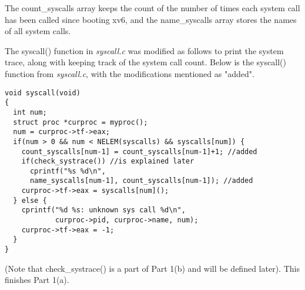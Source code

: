 \documentclass[a4paper]{article}
\begin{document}
\newpage
\noindent The count\_syscalls array keeps the count of the number of times each system call has been called since booting xv6, and the name\_syscalls array stores the names of all system calls. 
\newline

\noindent The syscall() function in \textit{syscall.c} was modified as follows to print the system trace, along with keeping track of the system call count. Below is the syscall() function from \textit{syscall.c}, with the modifications mentioned as "added".

\begin{lstlisting}
void syscall(void)
{
  int num;
  struct proc *curproc = myproc();
  num = curproc->tf->eax;
  if(num > 0 && num < NELEM(syscalls) && syscalls[num]) {
    count_syscalls[num-1] = count_syscalls[num-1]+1; //added
    if(check_systrace()) //is explained later
      cprintf("%s %d\n", 
      name_syscalls[num-1], count_syscalls[num-1]); //added
    curproc->tf->eax = syscalls[num]();
  } else {
    cprintf("%d %s: unknown sys call %d\n",
            curproc->pid, curproc->name, num);
    curproc->tf->eax = -1;
  }
}
\end{lstlisting}
(Note that check\_systrace() is a part of Part 1(b) and will be defined later).
\newline
\newline
This finishes Part 1(a).
\end{document}
